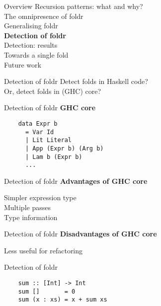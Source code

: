 \documentclass[20pt]{beamer}
\newcommand{\vspaced}{
    \vspace{5mm}
}
\begin{document}

\begin{frame}{Overview}
    Recursion patterns: what and why? \\
    The omnipresence of foldr \\
    Generalising foldr \\
    \textbf{Detection of foldr} \\
    Detection: results \\
    Towards a single fold \\
    Future work \\
\end{frame}

\begin{frame}{Detection of foldr}
    Detect folds in Haskell code? \\
    Or, detect folds in (GHC) core?
\end{frame}

\begin{frame}[fragile]{Detection of foldr}
    \textbf{GHC core} \\
    \vspaced
    \begin{lstlisting}
    data Expr b
      = Var Id
      | Lit Literal
      | App (Expr b) (Arg b)
      | Lam b (Expr b)
      ...
    \end{lstlisting}
\end{frame}

\begin{frame}[fragile]{Detection of foldr}
    \textbf{Advantages of GHC core} \\
    \vspaced
    Simpler expression type \\
    Multiple passes \\
    Type information \\
\end{frame}

\begin{frame}[fragile]{Detection of foldr}
    \textbf{Disadvantages of GHC core} \\
    \vspaced
    Less useful for refactoring
\end{frame}

\begin{frame}[fragile]{Detection of foldr}
    \begin{lstlisting}
    sum :: [Int] -> Int
    sum []       = 0
    sum (x : xs) = x + sum xs
    \end{lstlisting}
\end{frame}
\end{document}
